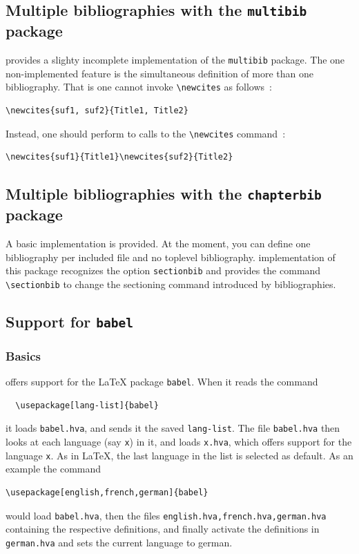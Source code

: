 \subsection{Multiple bibliographies with the \texttt{multibib} package}
\hevea{} provides a slighty incomplete implementation of the
\texttt{multibib} package. The one non-implemented feature is the
simultaneous definition of more than one bibliography.
That is one cannot invoke \verb+\newcites+ as follows~:
\begin{verbatim}
\newcites{suf1, suf2}{Title1, Title2}
\end{verbatim}
Instead, one should perform to calls to the \verb+\newcites+ command~:
\begin{verbatim}
\newcites{suf1}{Title1}\newcites{suf2}{Title2}
\end{verbatim}


\subsection{Multiple bibliographies with the \texttt{chapterbib} package}
A basic implementation is provided. At the moment, you can
define one bibliography per included file and no toplevel
bibliography.
\hevea{} implementation of this package recognizes the option
\verb+sectionbib+ and provides the command \verb+\sectionbib+
to change the sectioning command introduced by bibliographies.


\subsection{Support for \texttt{babel}}
\subsubsection{Basics}
\hevea{} offers support for the \LaTeX{} package {\tt babel}. When it reads the command
\begin{verbatim}
  \usepackage[lang-list]{babel}
\end{verbatim}
it loads {\tt babel.hva}, and sends it the saved {\tt lang-list}. The
file {\tt babel.hva} then looks at each language (say {\tt{}x}) in it, and loads {\tt x.hva}, which offers support for the language {\tt x}. As in \LaTeX, the last language in the list is selected as default. As an example the command
\begin{verbatim}
\usepackage[english,french,german]{babel}
\end{verbatim}
would load {\tt babel.hva}, then the files {\tt english.hva,french.hva,german.hva} containing the respective definitions, and finally activate the definitions in {\tt german.hva} and sets the current language to german.

